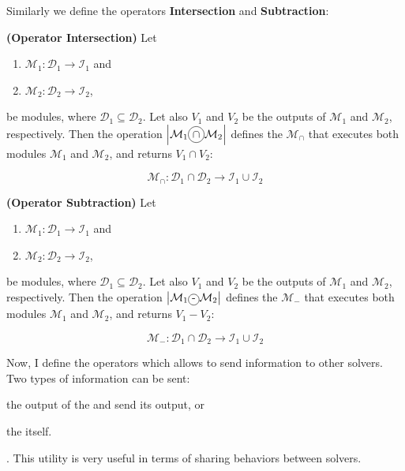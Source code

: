 Similarly we define the operators \textbf{Intersection} and \textbf{Subtraction}:

\begin{definition}\label{op:intersec}
{\bf (Operator Intersection)} Let 
\begin{enumerate}%
	\item $\mathcal{M}_1 : \mathcal{D}_1 \rightarrow \mathcal{I}_1$ and  
	\item $\mathcal{M}_2 : \mathcal{D}_2 \rightarrow \mathcal{I}_2$,
\end{enumerate}%
be modules, where $\mathcal{D}_1 \subseteq \mathcal{D}_2$. %
Let also $V_1$ and $V_2$ be the outputs of $\mathcal{M}_1$ and $\mathcal{M}_2$, respectively. Then the operation $\left|\mathcal{M}_1\circled{$\cap$}\mathcal{M}_2\right|$ defines the \cm{} $\mathcal{M}_{\cap}$ that executes both modules $\mathcal{M}_1$ and $\mathcal{M}_2$, and returns $V_1\cap V_2$:

\[
\mathcal{M}_{\cap}:\mathcal{D}_1\cap\mathcal{D}_2 \rightarrow \mathcal{I}_1 \cup \mathcal{I}_2
\]
\end{definition}

\begin{definition}\label{op:subst}
{\bf (Operator Subtraction)} Let 
\begin{enumerate}%
	\item $\mathcal{M}_1 : \mathcal{D}_1 \rightarrow \mathcal{I}_1$ and  
	\item $\mathcal{M}_2 : \mathcal{D}_2 \rightarrow \mathcal{I}_2$,
\end{enumerate}%
be modules, where $\mathcal{D}_1 \subseteq \mathcal{D}_2$. %
Let also $V_1$ and $V_2$ be the outputs of $\mathcal{M}_1$ and $\mathcal{M}_2$, respectively. Then the operation $\left|\mathcal{M}_1\circled{-}\mathcal{M}_2\right|$ defines the \cm{} $\mathcal{M}_{-}$ that executes both modules $\mathcal{M}_1$ and $\mathcal{M}_2$, and returns $V_1 - V_2$:

\[
\mathcal{M}_{-}:\mathcal{D}_1\cap\mathcal{D}_2 \rightarrow \mathcal{I}_1 \cup \mathcal{I}_2
\]
\end{definition}

Now, I define the operators which allows to send information to other solvers. Two types of information can be sent: 
\begin{inparaenum}[i)]
	\item the output of the \om{} and send its output, or 
	\item the \om{} itself.
\end{inparaenum}. This utility is very useful in terms of sharing behaviors between solvers.

